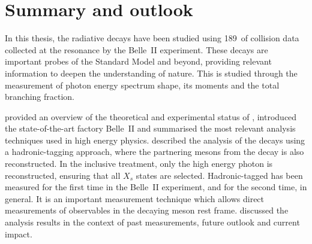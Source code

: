 \chapter{Summary and outlook}\label{ch:summary}

In this thesis, the radiative \BtoXsgamma decays have been studied using 189~\invfb of \epem collision data collected at the \FourS resonance by the Belle~II experiment.
These decays are important probes of the Standard Model and beyond, providing relevant information to deepen the understanding of nature.
This is studied through the measurement of \BtoXsgamma photon energy spectrum shape, its moments and the total branching fraction.

 provided an overview of the theoretical and experimental status of \mbox{\BtoXsgamma}, introduced the state-of-the-art \B factory Belle~II and summarised the most relevant analysis techniques used in high energy physics.
 described the analysis
of the \BtoXsgamma decays using a hadronic-tagging approach, where the partnering \B mesons from the \FourS decay is also reconstructed.
In the inclusive treatment, only the high energy photon is reconstructed, ensuring that all $X_s$ states are selected.
Hadronic-tagged \BtoXsgamma has been measured for the first time in the Belle~II experiment, and for the second time, in general.
It is an important measurement technique which allows direct measurements of observables in the decaying \B meson rest frame.
 discussed the analysis results in the context of past measurements, future outlook and current impact.

